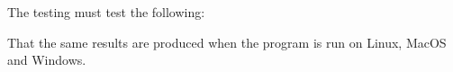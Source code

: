 The \bulk testing must test the following:

\item That the same results are produced when the program is run on
  Linux, MacOS and Windows.
